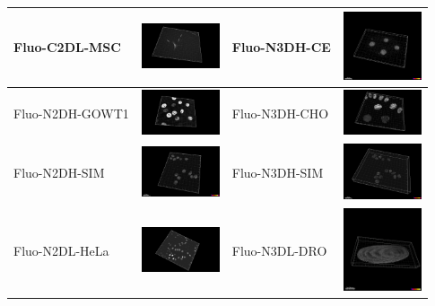 \documentclass[./dissertation.tex]{subfiles}
\begin{document}
\begin{table}[!ht]
\begin{tabular}{|l|c|l|c|}
    Fluo-C2DL-MSC            & \includegraphics[width=2.3cm]{figures/ctc/Fluo-C2DL-MSC.png}   & Fluo-N3DH-CE             & \includegraphics[width=2.3cm]{figures/ctc/Fluo-N3DH-CE.png}       \\ \hline
    Fluo-N2DH-GOWT1          & \includegraphics[width=2.3cm]{figures/ctc/Fluo-N2DH-GOWT1.png} & Fluo-N3DH-CHO            & \includegraphics[width=2.3cm]{figures/ctc/Fluo-N3DH-CHO.png}      \\ \hline
    Fluo-N2DH-SIM            & \includegraphics[width=2.3cm]{figures/ctc/Fluo-N2DH-SIM.png}   & Fluo-N3DH-SIM            & \includegraphics[width=2.3cm]{figures/ctc/Fluo-N3DH-SIM.png}      \\ \hline
    Fluo-N2DL-HeLa           & \includegraphics[width=2.3cm]{figures/ctc/Fluo-N2DL-HeLa.png}  & Fluo-N3DL-DRO            & \includegraphics[width=2.3cm]{figures/ctc/Fluo-N3DL-DRO.png}      \\ \hline

\end{tabular}
\end{table}
\end{document}
